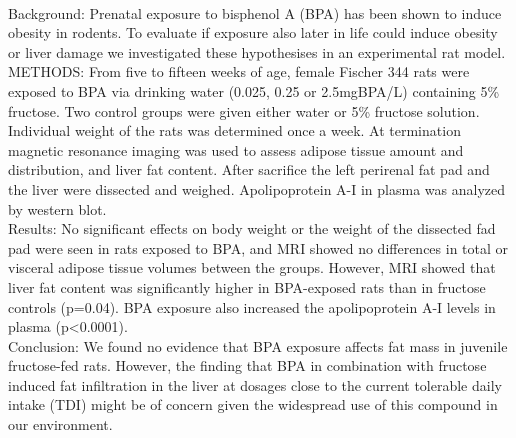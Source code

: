 {{\begin{enumerate}
\\ \aabstract
Background: Prenatal exposure to bisphenol A (BPA) has been shown to induce obesity in rodents. To evaluate if exposure also later in life could induce obesity or liver damage we investigated these hypothesises in an experimental rat model.\\
METHODS: From five to fifteen weeks of age, female Fischer 344 rats were exposed to BPA via drinking water (0.025, 0.25 or 2.5mgBPA/L) containing 5\% fructose. Two control groups were given either water or 5\% fructose solution. Individual weight of the rats was determined once a week. At termination magnetic resonance imaging was used to assess adipose tissue amount and distribution, and liver fat content. After sacrifice the left perirenal fat pad and the liver were dissected and weighed. Apolipoprotein A-I in plasma was analyzed by western blot.\\
Results: No significant effects on body weight or the weight of the dissected fad pad were seen in rats exposed to BPA, and MRI showed no differences in total or visceral adipose tissue volumes between the groups. However, MRI showed that liver fat content was significantly higher in BPA-exposed rats than in fructose controls (p=0.04). BPA exposure also increased the apolipoprotein A-I levels in plasma (p<0.0001).\\
Conclusion: We found no evidence that BPA exposure affects fat mass in juvenile fructose-fed rats. However, the finding that BPA in combination with fructose induced fat infiltration in the liver at dosages close to the current tolerable daily intake (TDI) might be of concern given the widespread use of this compound in our environment.


\end{enumerate}}}
